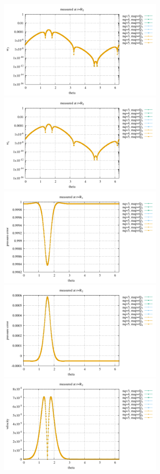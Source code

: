 \begin{center}
\includegraphics[width=8.3cm]{python_codes/fieldstone_152/results/exp2/sr3_R2}
\includegraphics[width=8.3cm]{python_codes/fieldstone_152/results/exp2/src_R2}\\
\includegraphics[width=8.3cm]{python_codes/fieldstone_152/results/exp2/qqq_R1}
\includegraphics[width=8.3cm]{python_codes/fieldstone_152/results/exp2/qqq_R2}\\
\includegraphics[width=8.3cm]{python_codes/fieldstone_152/results/exp2/vel_R2}

\end{center}
